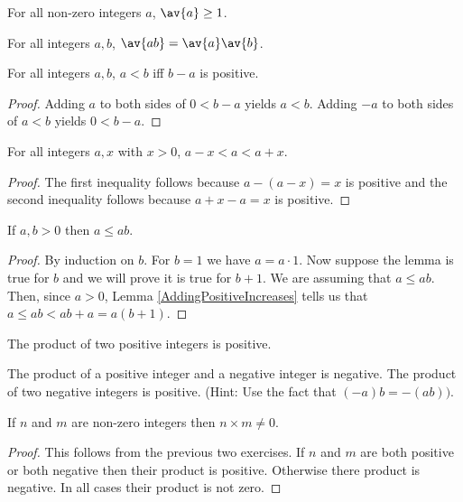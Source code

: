 \documentclass[oneside,12pt]{amsart}
\begin{document}
\begin{remark}
For all non-zero integers $a$, $\av{a} \geq 1$.
\end{remark}

\begin{homework}
For all integers $a,b$, $\av{ab} = \av{a}\av{b}$.
\end{homework}

\begin{lemma}
\label{OrderInTermsOfPositive}
For all integers $a,b$, $a<b$ iff $b-a$ is positive.
\end{lemma}
\begin{proof}
Adding $a$ to both sides of $0 < b-a$ yields $a<b$.
Adding $-a$ to both sides of $a<b$ yields $0 < b-a$.
\end{proof}

\begin{lemma}
\label{AddingPositiveIncreases}
For all integers $a,x$ with $x>0$, $a-x < a <a+x$.
\end{lemma}
\begin{proof}
The first inequality follows because $a-(a-x) = x$ is positive and
the second inequality follows because $a+x -a = x$ is positive.
\end{proof}

\begin{lemma}
\label{ProductOfTwoPositives}
If $a,b>0$ then $a \leq ab$.
\end{lemma}
\begin{proof}
By induction on $b$. For $b=1$ we have $a=a\cdot 1$. Now suppose the
lemma is true for $b$ and we will prove it is true for $b+1$.
We are assuming that $a\leq ab$. Then, since $a>0$, Lemma \ref{AddingPositiveIncreases}
tells us that $a \leq ab < ab+a = a(b+1)$.
\end{proof}

\begin{homework}
The product of two positive integers is positive.
\end{homework}

\begin{homework}
The product of a positive integer and a negative integer is negative.
The product of two negative integers is positive.
(Hint: Use the fact that $(-a)b = -(ab))$.
\end{homework}

\begin{lemma}
\label{ZIsAnIntegralDomain}
If $n$ and $m$ are non-zero integers then $n\times m \not=0$.
\end{lemma}
\begin{proof}
This follows from the previous two exercises. If $n$ and $m$ are both
positive or both negative then their product is positive. Otherwise there
product is negative. In all cases their product is not zero.
\end{proof}
\end{document}

